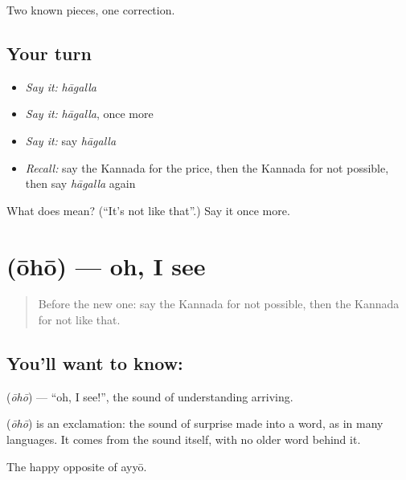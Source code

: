 \begin{grammarlens}[title={What you've built}]
Two known pieces, one correction.
\end{grammarlens}

\subsection*{Your turn}
\begin{itemize}
\raggedright
  \item \emph{Say it:} \emph{hāgalla}
  \item \emph{Say it:} \emph{hāgalla}, once more
  \item \emph{Say it:} say \emph{hāgalla}
  \item \emph{Recall:} say the Kannada for the price, then the Kannada for not possible, then say \emph{hāgalla} again
\end{itemize}

\begin{tcolorbox}[breakable,colback=teal!4,colframe=teal!35!black,title={Before you move on}]
What does  mean? (\textquotedblleft{}It's not like that\textquotedblright{}.) Say it once more.
\end{tcolorbox}
\section[\texorpdfstring{\kn{ಓಹೋ} (ōhō)}{ಓಹೋ (ōhō)}]{ (ōhō) — oh, I see}

\label{lesson:KA-C95-oh}



\begin{quote}
Before the new one: say the Kannada for not possible, then the Kannada for not like that.
\end{quote}

\subsection*{You'll want to know: }
\textbf{} (\emph{ōhō}) — \textquotedblleft{}oh, I see!\textquotedblright{}, the sound of understanding arriving.

\begin{cousinweb}
\textbf{} (\emph{ōhō}) is an exclamation: the sound of surprise made into a word, as in many languages. It comes from the sound itself, with no older word behind it.
\end{cousinweb}

\begin{grammarlens}[title={What you've built}]
The happy opposite of ayyō.
\end{grammarlens}

